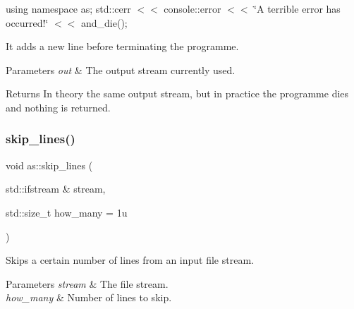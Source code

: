 using namespace as; std\+::cerr $<$$<$ console\+::error $<$$<$ \char`\"{}\+A terrible error has occurred!\char`\"{} $<$$<$ and\+\_\+die();

It adds a new line before terminating the programme.


\begin{DoxyParams}{Parameters}
{\em out} & The output stream currently used. \\
\hline
\end{DoxyParams}
\begin{DoxyReturn}{Returns}
In theory the same output stream, but in practice the programme dies and nothing is returned. 
\end{DoxyReturn}
\mbox{\label{namespaceas_a359f2d209e5ec052ec0d2752a589802d}} 
\subsubsection{\texorpdfstring{skip\+\_\+lines()}{skip\_lines()}}
{\footnotesize\ttfamily void as\+::skip\+\_\+lines (\begin{DoxyParamCaption}\item[{std\+::ifstream \&}]{stream,  }\item[{std\+::size\+\_\+t}]{how\+\_\+many = {\ttfamily 1u} }\end{DoxyParamCaption})\hspace{0.3cm}{\ttfamily [inline]}}



Skips a certain number of lines from an input file stream. 


\begin{DoxyParams}{Parameters}
{\em stream} & The file stream. \\
\hline
{\em how\+\_\+many} & Number of lines to skip. \\
\hline
\end{DoxyParams}
